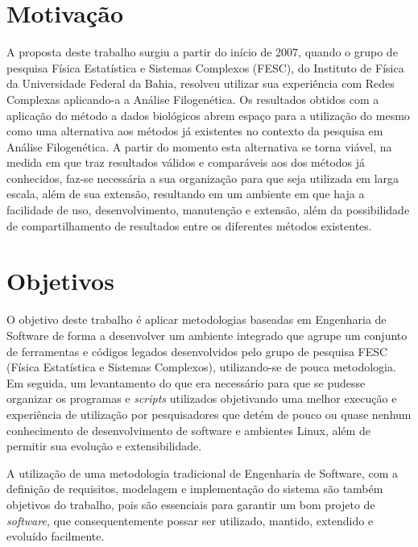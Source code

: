 \section{Motivação}

A proposta deste trabalho surgiu a partir do início de 2007, quando o grupo de pesquisa Física Estatística e Sistemas Complexos (FESC),
do Instituto de Física da Universidade Federal da Bahia, resolveu utilizar sua experiência com Redes Complexas aplicando-a a Análise Filogenética.
Os resultados obtidos com a aplicação do método a dados biológicos abrem espaço para a utilização do mesmo como uma alternativa aos métodos
já existentes no contexto da pesquisa em Análise Filogenética. A partir do momento esta alternativa se torna viável, na medida em que traz resultados
válidos e comparáveis aos dos métodos já conhecidos,
faz-se necessária a sua organização para que seja utilizada em larga escala, além de sua extensão,
resultando em um ambiente em que haja a facilidade de uso, desenvolvimento, manutenção e extensão, além da possibilidade de compartilhamento de
resultados entre os diferentes métodos existentes.

\section{Objetivos} \label{sec:objetivos}

O objetivo deste trabalho é aplicar metodologias baseadas em Engenharia de Software de forma a desenvolver um ambiente integrado que agrupe
um conjunto de ferramentas e códigos legados desenvolvidos pelo grupo de pesquisa FESC (Física Estatística e Sistemas Complexos),
utilizando-se de pouca metodologia. Em seguida, um levantamento do que era necessário para que
se pudesse organizar os programas e \textit{scripts} utilizados objetivando uma melhor execução e experiência de utilização por pesquisadores que detém de
pouco ou quase nenhum conhecimento de desenvolvimento de software e ambientes Linux, além de permitir sua evolução e extensibilidade.

A utilização de uma metodologia tradicional de Engenharia de Software, com a definição de requisitos, modelagem e implementação do sistema são também
objetivos do trabalho, pois são
essenciais para garantir um bom projeto de \textit{software}, que consequentemente possar ser utilizado, mantido, extendido
e evoluído facilmente.


